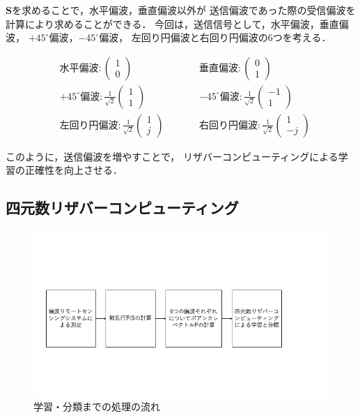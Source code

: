 \documentclass[uplatex,a4paper,12pt]{jsarticle}
\begin{document}
$\bm{S}$を求めることで，水平偏波，垂直偏波以外が
送信偏波であった際の受信偏波を計算により求めることができる．
今回は，送信信号として，水平偏波，垂直偏波，
$+45^\circ$偏波，$-45^\circ$偏波，
左回り円偏波と右回り円偏波の6つを考える．

\begin{align*}
    &水平偏波: \left(
        \begin{array}{c}
            1 \\
            0
        \end{array}
        \right) \qquad
    &&垂直偏波: \left(
        \begin{array}{c}
            0 \\
            1
        \end{array}
        \right)\\
    &+45^\circ 偏波: \frac{1}{\sqrt{2}}\left(
        \begin{array}{c}
            1 \\
            1
        \end{array}
        \right) \qquad
    &&-45^\circ 偏波: \frac{1}{\sqrt{2}}\left(
        \begin{array}{c}
            -1 \\
            1
        \end{array}
    \right)\\
    &左回り円偏波: \frac{1}{\sqrt{2}}\left(
        \begin{array}{c}
            1 \\
            j
        \end{array}
        \right) \qquad
    &&右回り円偏波: \frac{1}{\sqrt{2}}\left(
        \begin{array}{c}
            1 \\
            -j
        \end{array}
        \right)
\end{align*}

このように，送信偏波を増やすことで，
リザバーコンピューティングによる学習の正確性を向上させる．

\subsection{四元数リザバーコンピューティング}
\begin{figure}[hbtp]
	\centering
	\includegraphics[scale=0.4]{../img/process.png}
    \caption{学習・分類までの処理の流れ}
	\label{fig:process}
\end{figure}
\end{document}
